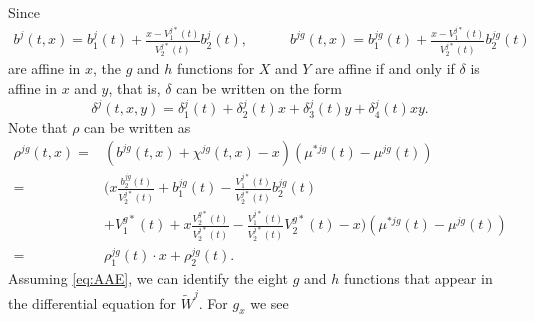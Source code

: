 \documentclass[12pt]{article}
\begin{document}
Since
\begin{gather*}
b^j(t,x)=b_1^j(t)+\frac{x-V_1^{j*}(t)}{V_2^{j*}(t)}b^j_2(t),
\qquad \quad
b^{jg}(t,x)=b_1^{jg}(t)+\frac{x-V_1^{j*}(t)}{V_2^{j*}(t)}b^{jg}_2(t)
\end{gather*}
are affine in $x$, the $g$ and $h$ functions for $X$ and $Y$ are affine if and only if $\delta$ is affine in $x$ and $y$, that is, $\delta$ can be written on the form
\begin{equation}
\delta^j(t,x,y)=\delta_1^j(t)+\delta_2^j(t)x+\delta_3^j(t)y+\delta_4^j(t)xy. \label{eq:AAE}
\end{equation}
Note that $\rho$ can be written as
\begin{align*}
\rho^{jg}(t,x)=&
(b^{jg}(t,x)+ \chi^{jg}(t,x)-x) (\mu^{*jg}(t)-\mu^{jg}(t))
\\
=& 
\bigg( x \frac{b_2^{jg}(t)}{V_2^{j*}(t)} + b_1^{jg}(t) -  \frac{V_1^{j*}(t)}{V_2^{j*}(t)}b_2^{jg}(t)
\\
& + V^{g*}_1(t) + x\frac{V^{g*}_2(t)}{V^{j*}_2(t)}-\frac{V^{j*}_1(t)}{V^{j*}_2(t)}V^{g*}_2(t)-x \bigg) (\mu^{*jg}(t)-\mu^{jg}(t))
\\
=&
\rho_1^{jg}(t)\cdot x+\rho_2^{jg}(t).
\end{align*}
Assuming \eqref{eq:AAE}, we can identify the eight $g$ and $h$ functions that appear in the differential equation for $\tilde{W}^j$. For $g_x$ we see
\end{document}
